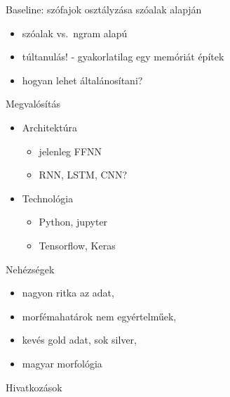 \documentclass[xcolor=rgb]{beamer}
\begin{document}
\begin{frame}{Baseline: szófajok osztályzása szóalak alapján}
    \begin{itemize}
        \item szóalak vs.~ngram alapú
        \item túltanulás! - gyakorlatilag egy memóriát építek
        \item hogyan lehet általánosítani?
    \end{itemize}
\end{frame}

\begin{frame}{Megvalósítás}
    \begin{itemize}
        \item Architektúra
            \begin{itemize}
                \item jelenleg FFNN
                \item RNN, LSTM, CNN?
            \end{itemize}
        \item Technológia
        \begin{itemize}
            \item Python, jupyter
            \item Tensorflow, Keras
        \end{itemize}
    \end{itemize}
\end{frame}

\begin{frame}{Nehézségek}
    \begin{itemize}
        \item nagyon ritka az adat,
        \item morfémahatárok nem egyértelműek,
        \item kevés gold adat, sok silver,
        \pause
        \item magyar morfológia
    \end{itemize}
\end{frame}

\begin{frame}{Hivatkoz\'asok}


\end{frame}
\end{document}
